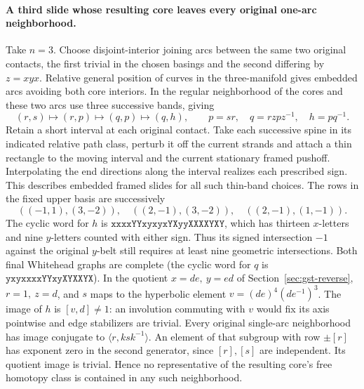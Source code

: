 \documentclass[11pt,letterpaper]{article}
\numberwithin{equation}{section}
\theoremstyle{remark}
\begin{document}
\paragraph{A third slide whose resulting core leaves every original one-arc neighborhood.}
Take \(n=3\). Choose disjoint-interior joining arcs between the same
two original contacts, the first trivial in the chosen basings and the
second differing by \(z=xyx\). Relative general position of curves in
the three-manifold gives embedded arcs avoiding both core interiors.
In the regular neighborhood of the cores and these two arcs use three
successive bands, giving
\[
 (r,s)\longmapsto(r,p)\longmapsto(q,p)\longmapsto(q,h),
 \qquad p=sr,\quad q=r z p z^{-1},\quad h=pq^{-1}.
\]
Retain a short interval at each original contact. Take each successive
spine in its indicated relative path class, perturb it off the current
strands and attach a thin rectangle to the moving interval and the
current stationary framed pushoff. Interpolating the end directions
along the interval realizes each prescribed sign. This describes
embedded framed slides for all such thin-band choices. The rows in
the fixed upper basis are successively
\[
 ((-1,1),(3,-2)),\quad ((2,-1),(3,-2)),\quad ((2,-1),(1,-1)).
\]
The cyclic word for \(h\) is
\(\mathtt{xxxxYYxyxyxYXyyXXXXYXY}\), which has thirteen \(x\)-letters
and nine \(y\)-letters counted with either sign. Thus its signed
intersection \(-1\) against the original \(y\)-belt still requires
at least nine geometric intersections. Both final Whitehead graphs
are complete (the cyclic word for \(q\) is
\(\mathtt{yxyxxxxYYxyXYXXYX}\)).
In the quotient \(x=de,\ y=ed\) of Section~\ref{sec:gst-reverse},
\(r=1,\ z=d\), and \(s\) maps to the hyperbolic element
\(v=(de)^4(de^{-1})^3\). The image of \(h\) is \([v,d]\ne1\):
an involution commuting with \(v\) would fix its axis pointwise and
edge stabilizers are trivial. Every original single-arc neighborhood
has image conjugate to \(\langle r,k s k^{-1}\rangle\).
An element of that subgroup with row \(\pm[r]\) has exponent zero
in the second generator, since \([r],[s]\) are independent. Its
quotient image is trivial. Hence no representative of the resulting core's free homotopy
class is contained in any such neighborhood.
\end{document}
